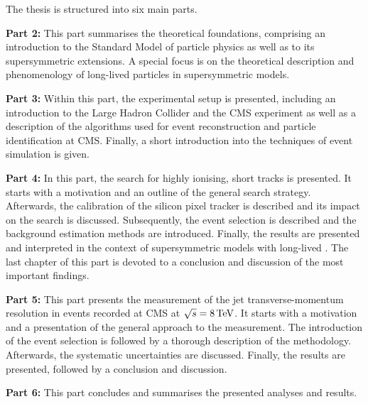 \noindent The thesis is structured into six main parts.
\begin{description}
\item \textbf{Part 2:} This part summarises the theoretical foundations, comprising an introduction to the Standard Model of particle physics as well as to its supersymmetric extensions.
A special focus is on the theoretical description and phenomenology of long-lived particles in supersymmetric models.
\item \textbf{Part 3:} Within this part, the experimental setup is  presented, including an introduction to the Large Hadron Collider and the CMS experiment as well as a description of the algorithms used for event reconstruction and particle identification at CMS. Finally, a short introduction into the techniques of event simulation is given.
\item \textbf{Part 4:}  In this part, the search for highly ionising, short tracks is presented. It starts with a motivation and an outline of the general search strategy. Afterwards, the calibration of the silicon pixel tracker is described and its impact on the search is discussed. Subsequently, the event selection is described and the background estimation methods are introduced. Finally, the results are presented and interpreted in the context of supersymmetric models with long-lived \chipm. The last chapter of this part is devoted to a conclusion and discussion of the most important findings.
\item \textbf{Part 5:} This part presents the measurement of the jet transverse-momentum resolution in \GAMJET events recorded at CMS at $\sqrt{s}=8\,\text{Te}\kern-0.06667em\text{V}$. It starts with a motivation and a presentation of the general approach to the measurement. The introduction of the event selection is followed by a thorough description of the methodology. Afterwards, the systematic uncertainties are discussed. Finally, the results are presented, followed by a conclusion and discussion.
\item \textbf{Part 6:} This part concludes and summarises the presented analyses and results.
\end{description}

